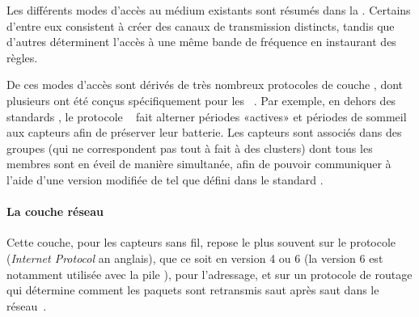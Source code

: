 Les différents modes d'accès au médium existants sont résumés dans la .
Certains d'entre eux consistent à créer des canaux de transmission distincts, tandis que d'autres déterminent l'accès à une même bande de fréquence en instaurant des règles.

De ces modes d'accès sont dérivés de très nombreux protocoles de couche \mac, dont plusieurs ont été conçus spécifiquement pour les \rcs~\cite{YB09}.
Par exemple, en dehors des standards \ieee, le protocole \smac~\cite{YHE02} fait alterner périodes «actives» et périodes de sommeil aux capteurs afin de préserver leur batterie.
Les capteurs sont associés dans des groupes (qui ne correspondent pas tout à fait à des clusters) dont tous les membres sont en éveil de manière simultanée, afin de pouvoir communiquer à l'aide d'une version modifiée de \csmaca tel que défini dans le standard \ieeee.

            \paragraph{La couche réseau}
Cette couche, pour les capteurs sans fil, repose le plus souvent sur le protocole \ip (\textit{Internet Protocol} an anglais), que ce soit en version 4 ou 6 (la version 6 est notamment utilisée avec la pile \slowpan), pour l'adressage, et sur un protocole de routage qui détermine comment les paquets sont retransmis saut après saut dans le réseau~\cite{TW10}.

